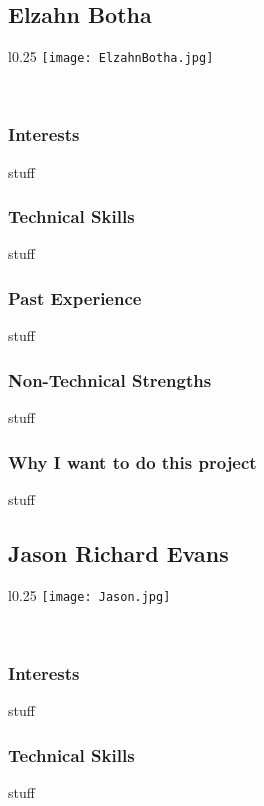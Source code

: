 
\subsection{Elzahn Botha}
\begin{wrapfigure}[6]{l}{0.25\textwidth}
\vspace{10pt}
\texttt{[image: ElzahnBotha.jpg]}
\end{wrapfigure}

\textcolor{white}{.}
\subsubsection{Interests} stuff
\subsubsection{Technical Skills} stuff
\subsubsection{Past Experience} stuff
\subsubsection{Non-Technical Strengths} stuff
\subsubsection{Why I want to do this project} stuff

\subsection{Jason Richard Evans}
\begin{wrapfigure}[5]{l}{0.25\textwidth}
\vspace{10pt}
\texttt{[image: Jason.jpg]}
\end{wrapfigure}

\textcolor{white}{.}
\subsubsection{Interests} stuff 
\subsubsection{Technical Skills} stuff
